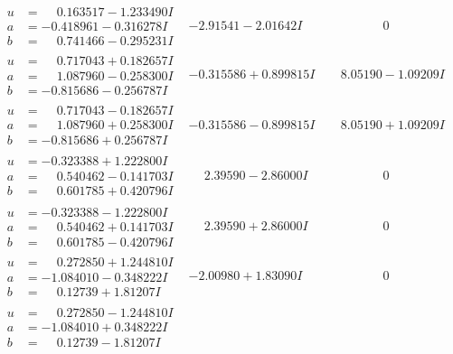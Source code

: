 \documentclass[1p]{elsarticle_modified}
\theoremstyle{definition}
\begin{document}
$$\begin{array}{c|c|c}
\begin{aligned}
u &= \phantom{-}0.163517 - 1.233490 I \\
a &= -0.418961 - 0.316278 I \\
b &= \phantom{-}0.741466 - 0.295231 I\end{aligned}
 & -2.91541 - 2.01642 I & \phantom{-0.000000 } 0 \\ \hline\begin{aligned}
u &= \phantom{-}0.717043 + 0.182657 I \\
a &= \phantom{-}1.087960 - 0.258300 I \\
b &= -0.815686 - 0.256787 I\end{aligned}
 & -0.315586 + 0.899815 I & \phantom{-}8.05190 - 1.09209 I \\ \hline\begin{aligned}
u &= \phantom{-}0.717043 - 0.182657 I \\
a &= \phantom{-}1.087960 + 0.258300 I \\
b &= -0.815686 + 0.256787 I\end{aligned}
 & -0.315586 - 0.899815 I & \phantom{-}8.05190 + 1.09209 I \\ \hline\begin{aligned}
u &= -0.323388 + 1.222800 I \\
a &= \phantom{-}0.540462 - 0.141703 I \\
b &= \phantom{-}0.601785 + 0.420796 I\end{aligned}
 & \phantom{-}2.39590 - 2.86000 I & \phantom{-0.000000 } 0 \\ \hline\begin{aligned}
u &= -0.323388 - 1.222800 I \\
a &= \phantom{-}0.540462 + 0.141703 I \\
b &= \phantom{-}0.601785 - 0.420796 I\end{aligned}
 & \phantom{-}2.39590 + 2.86000 I & \phantom{-0.000000 } 0 \\ \hline\begin{aligned}
u &= \phantom{-}0.272850 + 1.244810 I \\
a &= -1.084010 - 0.348222 I \\
b &= \phantom{-}0.12739 + 1.81207 I\end{aligned}
 & -2.00980 + 1.83090 I & \phantom{-0.000000 } 0 \\ \hline\begin{aligned}
u &= \phantom{-}0.272850 - 1.244810 I \\
a &= -1.084010 + 0.348222 I \\
b &= \phantom{-}0.12739 - 1.81207 I\end{aligned}

\end{array}$$
\end{document}
